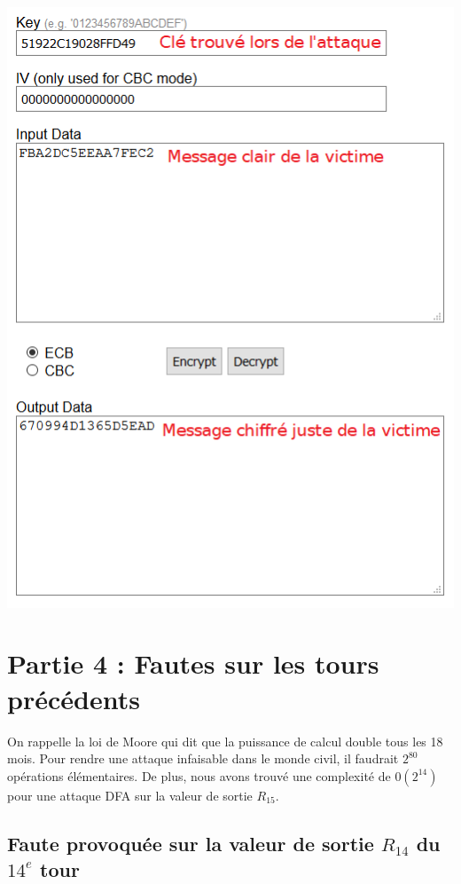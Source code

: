 \documentclass[11pt]{article}
\begin{document}
\begin{center}\includegraphics[scale=0.5]{../pictures/resultat.png}\end{center}

\section{Partie 4 : Fautes sur les tours précédents}

On rappelle la loi de Moore qui dit que la puissance de calcul double tous les 18 mois. Pour rendre une attaque infaisable dans le monde civil, il faudrait $2^{80}$ opérations élémentaires. \newline
De plus, nous avons trouvé une complexité de $0(2^{14})$ pour une attaque DFA sur la valeur de sortie $R_{15}$. 

\subsection{Faute provoquée sur la valeur de sortie $R_{14}$ du $14^{e}$ tour}
\end{document}
